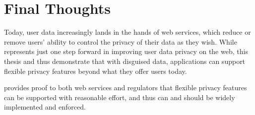%
%
%
\section{Final Thoughts}
Today, user data increasingly lands in the hands of web services, which reduce
or remove users' ability to control the privacy of their data as they wish.
%
While \sys represents just one step forward in improving user data privacy on
the web, this thesis and \sys thus demonstrate that with disguised data,
applications can support flexible privacy features beyond what they offer users
today.


\sys provides proof to both web services and regulators that flexible
privacy features can be supported with reasonable effort, and thus can and
should be widely implemented and enforced.
%

